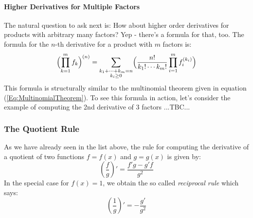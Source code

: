 

\paragraph{Higher Derivatives for Multiple Factors}
The natural question to ask next is: How about higher order derivatives for products with arbitrary many factors? Yep - there's a formula for that, too. The formula for the $n$-th derivative for a product with $m$ factors is:
\begin{equation}
\Bigl( \prod_{k=1}^{m} f_k \Bigr)^{(n)} =
\sum_{\substack{k_1 + \cdots + k_m = n \\ k_i \geq 0}} 
\Bigl(
\frac{n!}{k_1! \cdots k_m!}
\prod_{i=1}^{m} f_i^{(k_i)} 
\Bigr)
\end{equation}
This formula is structurally similar to the multinomial theorem given in equation (\ref{Eq:MultinomialTheorem}). To see this formula in action, let's consider the example of computing the 2nd derivative of 3 factors ...TBC... 








\subsubsection{The Quotient Rule} 
As we have already seen in the list above, the rule for computing the derivative of a quotient of two functions $f = f(x)$ and $g = g(x)$ is given by:
\begin{equation}
\left( \frac{f}{g} \right) ' = 
\frac{f' g - g' f}{g^2}
\end{equation}
In the special case for $f(x) = 1$, we obtain the so called \emph{reciprocal rule} which says:
\begin{equation}
\left( \frac{1}{g} \right) ' = 
- \frac{g'}{g^2}
\end{equation}

